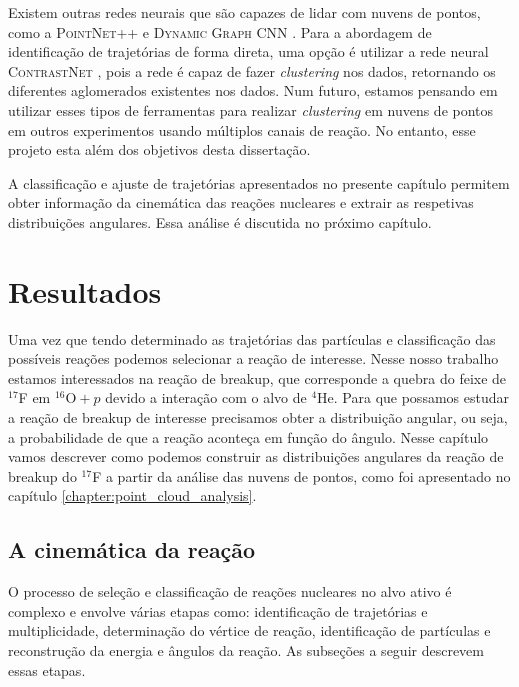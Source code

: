 \documentclass[a4paper,12pt,oneside]{book}
\begin{document}
\par Existem outras redes neurais que são capazes de lidar com nuvens de pontos, como a \textsc{PointNet++} \cite{qi2017pointnetplusplus} e \textsc{Dynamic Graph CNN} \cite{graph_cnn}. Para a abordagem de identificação de trajetórias de forma direta, uma opção é utilizar a rede neural \textsc{ContrastNet} \cite{contrastnet}, pois a rede é capaz de fazer \textit{clustering} nos dados, retornando os diferentes aglomerados existentes nos dados. Num futuro, estamos pensando em utilizar esses tipos de ferramentas para realizar \textit{clustering} em nuvens de pontos em outros experimentos usando múltiplos canais de reação. No entanto, esse projeto esta além dos objetivos desta dissertação.

\par A classificação e ajuste de trajetórias apresentados no presente capítulo permitem obter informação da cinemática das reações nucleares e extrair as respetivas distribuições angulares. Essa análise é discutida no próximo capítulo.

\chapter{Resultados}\label{chapter:resultados}

\par Uma vez que tendo determinado as trajetórias das partículas e classificação das possíveis reações podemos selecionar a reação de interesse. Nesse nosso trabalho estamos interessados na reação de breakup, que corresponde a quebra do feixe de $^{17}$F em ${}^{16}\text{O}+p$ devido a interação com o alvo de $^{4}$He. Para que possamos estudar a reação de breakup de interesse precisamos obter a distribuição angular, ou seja, a probabilidade de que a reação aconteça em função do ângulo.
Nesse capítulo vamos descrever como podemos construir as distribuições angulares da reação de breakup do $^{17}$F a partir da análise das nuvens de pontos, como foi apresentado no capítulo \ref{chapter:point_cloud_analysis}.

\section{A cinemática da reação}\label{sec:identif_reac_nucl}

\par O processo de seleção e classificação de reações nucleares no alvo ativo é complexo e envolve várias etapas como: identificação de trajetórias e multiplicidade, determinação do vértice de reação, identificação de partículas e reconstrução da energia e ângulos da reação. As subseções a seguir descrevem essas etapas.
\end{document}
